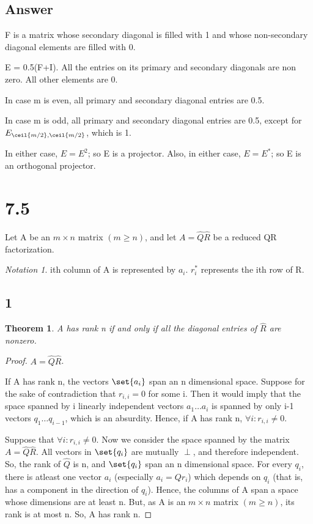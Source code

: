 \documentclass[10pt]{amsart}
\newtheorem{thm}{Theorem}[subsection]
\theoremstyle{remark}
\newtheorem*{notation}{Notation}
\begin{document}
\subsection{Answer}
F is a matrix whose secondary diagonal is filled with 1 and whose non-secondary diagonal elements are filled with 0.

E = 0.5(F+I). All the entries on its primary and secondary diagonals are non zero. All other elements are 0.

In case m is even, all primary and secondary diagonal entries are 0.5.

In case m is odd, all primary and secondary diagonal entries are 0.5, except for $E_{\ceil{m/2}, \ceil{m/2}}$, which is 1.

In either case, $E=E^{2}$; so E is a projector. Also, in either case, $E=E^{*}$; so E is an orthogonal projector.

\section{7.5}
Let A be an $m\times n$ matrix $(m\geq n)$, and let $A=\hat{Q}\hat{R}$ be a reduced QR factorization.


\begin{notation}
ith column of A is represented by $a_{i}$. $r_{i}^{*}$ represents the ith row of R.
\end{notation}


\subsection{1}
\begin{thm}
A has rank n if and only if all the diagonal entries of $\hat{R}$ are nonzero.
\end{thm}

\begin{proof}
$A=\hat{Q}\hat{R}$.

If A has rank n, the vectors $\set{a_{i}}$ span an n dimensional space. Suppose for the sake of contradiction that $r_{i,i} = 0$ for some i. Then it would imply that the space spanned by i linearly independent vectors $a_{1} \dots a_{i}$ is spanned by only i-1 vectors $q_{1} \dots q_{i-1}$, which is an absurdity. Hence, if A has rank n, $\forall i: r_{i,i} \neq 0$.

Suppose that $\forall i: r_{i,i} \neq 0$. Now we consider the space spanned by the matrix $A=\hat{Q}\hat{R}$. All vectors in $\set{q_{i}}$ are mutually $\perp$, and therefore independent. So, the rank of $\hat{Q}$ is n, and $\set{q_{i}}$ span an n dimensional space. For every $q_{i}$, there is atleast one vector $a_{i}$ (especially $a_{i} = Qr_{i}$) which depends on $q_{i}$ (that is, has a component in the direction of $q_{i}$). Hence, the columns of A span a space whose dimensions are at least n. But, as A is an $m\times n$ matrix $(m\geq n)$, its rank is at most n. So, A has rank n.
\end{proof}
\end{document}
